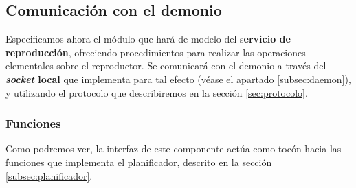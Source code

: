 \subsection{Comunicación con el demonio}
\label{subsec:web_demonio}

Especificamos ahora el módulo que hará de modelo del s\textbf{ervicio de reproducción}, ofreciendo procedimientos para realizar las operaciones elementales sobre el reproductor. Se comunicará con el demonio a través del \textbf{\textit{socket} local} que implementa para tal efecto (véase el apartado \ref{subsec:daemon}), y utilizando el protocolo que describiremos en la sección \ref{sec:protocolo}.

\subsubsection{Funciones}

Como podremos ver, la interfaz de este componente actúa como tocón hacia las funciones que implementa el planificador, descrito en la sección \ref{subsec:planificador}.

